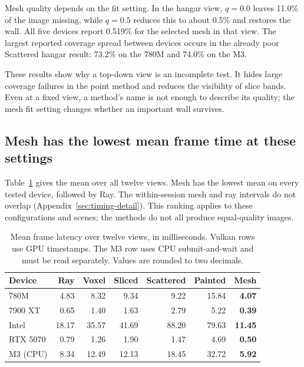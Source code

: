 \documentclass{jcgt}
\begin{document}
Mesh quality depends on the fit setting. In the hangar view, $q=0.0$ leaves 11.0\% of the image missing, while $q=0.5$ reduces this to about 0.5\% and restores the wall. All five devices report 0.519\% for the selected mesh in that view. The largest reported coverage spread between devices occurs in the already poor Scattered hangar result: 73.2\% on the 780M and 74.0\% on the M3.

These results show why a top-down view is an incomplete test. It hides large coverage failures in the point method and reduces the visibility of slice bands. Even at a fixed view, a method's name is not enough to describe its quality; the mesh fit setting changes whether an important wall survives.

\subsection{Mesh has the lowest mean frame time at these settings}\label{sec:timing}

Table~\ref{tab:timing} gives the mean over all twelve views. Mesh has the lowest mean on every tested device, followed by Ray. The within-session mesh and ray intervals do not overlap (Appendix~\ref{sec:timing-detail}). This ranking applies to these configurations and scenes; the methods do not all produce equal-quality images.

\begin{table}[tbp]\centering\small
\caption{Mean frame latency over twelve views, in milliseconds. Vulkan rows use GPU timestamps. The M3 row uses CPU submit-and-wait and must be read separately. Values are rounded to two decimals.}\label{tab:timing}
\setlength{\tabcolsep}{3pt}
\begin{tabular}{@{}lrrrrrr@{}}
\toprule
Device & Ray & Voxel & Sliced & Scattered & Painted & Mesh \\
\midrule
780M & 4.83 & 8.32 & 9.34 & 9.22 & 15.84 & \textbf{4.07} \\
7900 XT & 0.65 & 1.40 & 1.63 & 2.79 & 5.22 & \textbf{0.39} \\
Intel & 18.17 & 35.57 & 41.69 & 88.20 & 79.63 & \textbf{11.45} \\
RTX 5070 & 0.79 & 1.26 & 1.90 & 1.47 & 4.69 & \textbf{0.50} \\
\midrule
M3 (CPU) & 8.34 & 12.49 & 12.13 & 18.45 & 32.72 & \textbf{5.92} \\
\bottomrule
\end{tabular}
\end{table}
\end{document}
